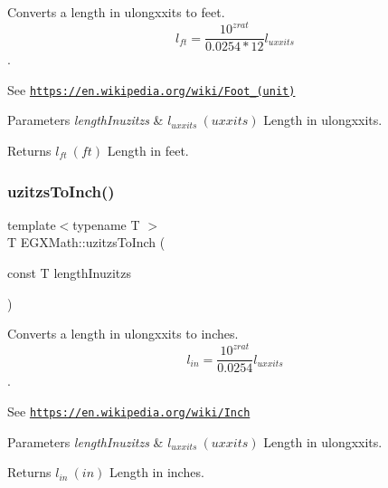 Converts a length in ulongxxits to feet. \[ l_{ft}= \frac{10^{zrat}}{0.0254 * 12} l_{uxxits} \]. 

See \href{https://en.wikipedia.org/wiki/Foot_(unit)}{\tt https\+://en.\+wikipedia.\+org/wiki/\+Foot\+\_\+(unit)} 
\begin{DoxyParams}{Parameters}
{\em length\+Inuzitzs} & $ l_{uxxits}\ (uxxits)$ Length in ulongxxits. \\
\hline
\end{DoxyParams}
\begin{DoxyReturn}{Returns}
$ l_{ft}\ (ft)$ Length in feet. 
\end{DoxyReturn}
\mbox{\label{group___e_g_x_math-_conversions-_length_conversions-_non-_s_i-uzitzs-_imperial_gad471f5c0b894eb0f2850a19347306ed4}} 
\subsubsection{\texorpdfstring{uzitzs\+To\+Inch()}{uzitzsToInch()}}
{\footnotesize\ttfamily template$<$typename T $>$ \\
T E\+G\+X\+Math\+::uzitzs\+To\+Inch (\begin{DoxyParamCaption}\item[{const T}]{length\+Inuzitzs }\end{DoxyParamCaption})}



Converts a length in ulongxxits to inches. \[ l_{in}= \frac{10^{zrat}}{0.0254} l_{uxxits} \]. 

See \href{https://en.wikipedia.org/wiki/Inch}{\tt https\+://en.\+wikipedia.\+org/wiki/\+Inch} 
\begin{DoxyParams}{Parameters}
{\em length\+Inuzitzs} & $ l_{uxxits}\ (uxxits)$ Length in ulongxxits. \\
\hline
\end{DoxyParams}
\begin{DoxyReturn}{Returns}
$ l_{in}\ (in)$ Length in inches. 
\end{DoxyReturn}
\mbox{\label{group___e_g_x_math-_conversions-_length_conversions-_non-_s_i-uzitzs-_imperial_ga53d4abecb2e7ac39c15c4ef89b9447a9}} 

